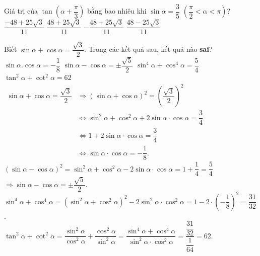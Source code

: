 							\begin{ex}%
								Giá trị của $\tan\left(\alpha+\dfrac{\pi}{3}\right)$ bằng bao nhiêu khi $\sin\alpha=\dfrac{3}{5}$ $\left(\dfrac{\pi}{2}<\alpha <\pi\right)$?
								\choice
								{$\dfrac{-48+25\sqrt{3}}{11}$}
								{$\dfrac{48+25\sqrt{3}}{11}$}
								{$-\dfrac{48+25\sqrt{3}}{11}$}
								{\True $\dfrac{48-25\sqrt{3}}{11}$}
							\end{ex}
							
		
								\begin{ex}%
									Biết $\sin\alpha+\cos\alpha=\dfrac{\sqrt{3}}{2}$. Trong các kết quả sau, kết quả nào {\bf sai}?
									\choice
									{$\sin\alpha .\cos\alpha=-\dfrac{1}{8}$}
									{$\sin\alpha-\cos\alpha=\pm\dfrac{\sqrt{5}}{2}$}
									{\True $\sin^4\alpha+\cos^4\alpha=\dfrac{5}{4}$}
									{$\tan^2\alpha+\cot^2\alpha=62$}
									\loigiai
									{		$\begin{aligned}
											\sin\alpha+\cos\alpha=\dfrac{\sqrt{3}}{2}&\Rightarrow{\left(\sin\alpha+\cos\alpha\right)^2}=\left(\dfrac{\sqrt{3}}{2}\right)^2\\ 
											&\Leftrightarrow{\sin^2}\alpha+\cos^2\alpha+2\sin\alpha \cdot \cos\alpha=\dfrac{3}{4}\\ 
											&\Leftrightarrow 1+2\sin\alpha \cdot \cos\alpha=\dfrac{3}{4}\\ 
											&\Leftrightarrow\sin\alpha \cdot \cos\alpha=-\dfrac{1}{8}. 
										\end{aligned}$\\
										$\left(\sin\alpha-\cos\alpha\right)^2=\sin^2\alpha+\cos^2\alpha-2\sin\alpha \cdot \cos\alpha=1+\dfrac{1}{4}=\dfrac{5}{4}$ 
										$\Rightarrow\sin\alpha-\cos\alpha=\pm\dfrac{\sqrt{5}}{2}$.\\
										$\sin^4\alpha+\cos^4\alpha=\left(\sin^2\alpha+\cos^2\alpha\right)^2-2\sin^2\alpha \cdot \cos^2\alpha=1-2\cdot \left(-\dfrac{1}{8}\right)^2=\dfrac{31}{32}$.\\
										$\tan^2\alpha+\cot^2\alpha=\dfrac{\sin^2\alpha}{\cos^2\alpha}+\dfrac{\cos^2\alpha}{\sin^2\alpha}=\dfrac{\sin^4\alpha+\cos^4\alpha}{\sin^2\alpha \cdot \cos^2\alpha}=\dfrac{\dfrac{31}{32}}{\dfrac{1}{64}}=62$.
									}
								\end{ex}
								
